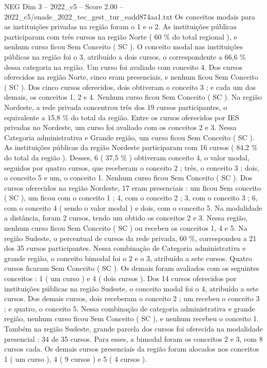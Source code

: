 \begin{textsample}{NEG Dim 3 – 2022\_c5 – Score 2.00 – 2022\_c5/enade\_2022\_tec\_gest\_tur\_eadd874aa1.txt}
Os conceitos modais para as instituições privadas na região foram o 1 e o 2.
As instituições públicas participaram com três cursos na região Norte ( 60 \% do total regional ), e nenhum curso ficou Sem Conceito ( SC ).
O conceito modal nas instituições públicas na região foi o 3, atribuído a dois cursos, o correspondente a 66,6 \% dessa categoria na região.
Um curso foi avaliado com conceito 4.
Dos cursos oferecidos na região Norte, cinco eram presenciais, e nenhum ficou Sem Conceito ( SC ).
Dos cinco cursos oferecidos, dois obtiveram o conceito 3 ; e cada um dos demais, os conceitos 1, 2 e 4.
Nenhum curso ficou Sem Conceito ( SC ).
Na região Nordeste, a rede privada concentrou três dos 19 cursos participantes, o equivalente a 15,8 \% do total da região.
Entre os cursos oferecidos por IES privadas no Nordeste, um curso foi avaliado com os conceitos 2 e 3.
Nessa Categoria administrativa e Grande região, um curso ficou Sem Conceito ( SC ).
As instituições públicas da região Nordeste participaram com 16 cursos ( 84,2 \% do total da região ).
Desses, 6 ( 37,5 \% ) obtiveram conceito 4, o valor modal, seguidos por quatro cursos, que receberam o conceito 2 ; três, o conceito 3 ; dois, o conceito 5 e um, o conceito 1.
Nenhum curso ficou Sem Conceito ( SC ).
Dos cursos oferecidos na região Nordeste, 17 eram presenciais : um ficou Sem conceito ( SC ), um ficou com o conceito 1 ; 4, com o conceito 2 ; 3, com o conceito 3 ; 6, com o conceito 4 ( sendo o valor modal ) e dois, com o conceito 5.
Na modalidade a distância, foram 2 cursos, tendo um obtido os conceitos 2 e 3.
Nessa região, nenhum curso ficou Sem Conceito ( SC ) ou recebeu os conceitos 1, 4 e 5.
Na região Sudeste, o percentual de cursos da rede privada, 60 \%, correspondeu a 21 dos 35 cursos participantes.
Nessa combinação de Categoria administrativa e grande região, o conceito bimodal foi o 2 e o 3, atribuído a sete cursos.
Quatro cursos ficaram Sem Conceito ( SC ).
Os demais foram avaliados com os seguintes conceitos : 1 ( um curso ) e 4 ( dois cursos ).
Dos 14 cursos oferecidos por instituições públicas na região Sudeste, o conceito modal foi o 4, atribuído a sete cursos.
Dos demais cursos, dois receberam o conceito 2 ; um recebeu o conceito 3 ; e quatro, o conceito 5.
Nessa combinação de categoria administrativa e grande região, nenhum curso ficou Sem Conceito ( SC ), e nenhum recebeu o conceito 1.
Também na região Sudeste, grande parcela dos cursos foi oferecida na modalidade presencial : 34 de 35 cursos.
Para esses, a bimodal foram os conceitos 2 e 3, com 8 cursos cada.
Os demais cursos presenciais da região foram alocados nos conceitos 1 ( um curso ), 4 ( 9 cursos ) e 5 ( 4 cursos ).

\end{textsample}
